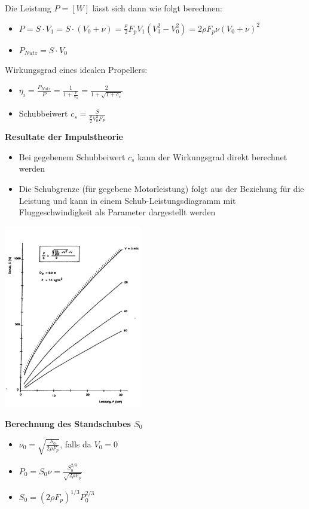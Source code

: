 \documentclass[8pt, landscape, fleqn]{scrartcl}
\begin{document}
\begin{multicols*}{3}
Die Leistung $P = [W]$ lässt sich dann wie folgt berechnen:

\begin{itemize}
    \item $P = S\cdot V_1 = S\cdot (V_0+\nu) = \frac{\rho}{2} F_p V_1 (V_3^2 - V_0^2) = 2 \rho F_p \nu (V_0+\nu)^2$
    \item $P_{Nutz} = S \cdot V_0$
\end{itemize}

Wirkungsgrad eines idealen Propellers:
\begin{itemize}
    \item $\eta_i = \frac{P_{Nutz}}{P} = \frac{1}{1 +\frac{\nu}{V_0}} = \frac{2}{1 + \sqrt{1 + c_s}}$
    \item Schubbeiwert $c_s = \frac{S}{\frac{\rho}{2}V_0^2 F_P}$
\end{itemize} 

\textbf{Resultate der Impulstheorie}

\begin{itemize}
    \item Bei gegebenem Schubbeiwert $c_s$ kann der Wirkungsgrad direkt berechnet werden
    \item Die Schubgrenze (für gegebene Motorleistung) folgt aus der Beziehung für die Leistung und kann in einem Schub-Leistungsdiagramm mit Fluggeschwindigkeit als Parameter dargestellt werden
\end{itemize}

\begin{center}
    \includegraphics[width=6cm]{images/Schubgrenze.png}
\end{center}

\textbf{Berechnung des Standschubes $S_0$}

\begin{itemize}
    \item $\nu_0 = \sqrt{\frac{S_0}{2 \rho F_p}}$, falls da $V_0=0$
    \item $P_0 = S_0 \nu = \frac{S_0^{2/3}}{\sqrt{2 \rho F_p}}$
    \item $S_0 = \left( 2 \rho F_p \right)^{1/3} P_0^{2/3}$
\end{itemize}


\end{multicols*}
\end{document}
